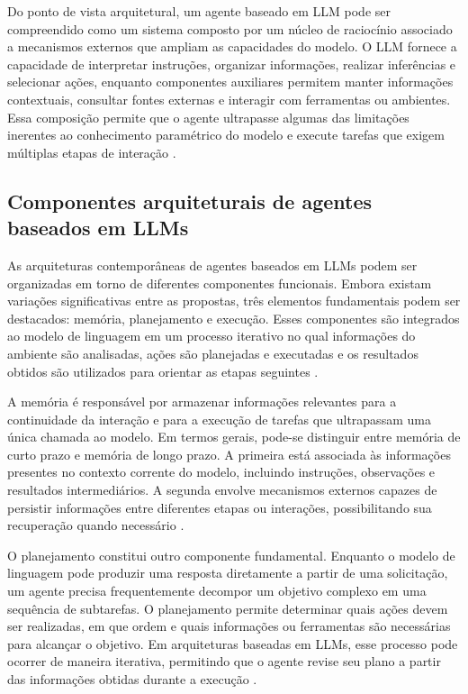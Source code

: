 Do ponto de vista arquitetural, um agente baseado em LLM pode ser compreendido como um sistema composto por um núcleo de raciocínio associado a mecanismos externos que ampliam as capacidades do modelo. O LLM fornece a capacidade de interpretar instruções, organizar informações, realizar inferências e selecionar ações, enquanto componentes auxiliares permitem manter informações contextuais, consultar fontes externas e interagir com ferramentas ou ambientes. Essa composição permite que o agente ultrapasse algumas das limitações inerentes ao conhecimento paramétrico do modelo e execute tarefas que exigem múltiplas etapas de interação \cite{cheng2026,zhao2026survey}.

\subsection{Componentes arquiteturais de agentes baseados em LLMs}

As arquiteturas contemporâneas de agentes baseados em LLMs podem ser organizadas em torno de diferentes componentes funcionais. Embora existam variações significativas entre as propostas, três elementos fundamentais podem ser destacados: memória, planejamento e execução. Esses componentes são integrados ao modelo de linguagem em um processo iterativo no qual informações do ambiente são analisadas, ações são planejadas e executadas e os resultados obtidos são utilizados para orientar as etapas seguintes \cite{cheng2026,zhao2026survey}.

A memória é responsável por armazenar informações relevantes para a continuidade da interação e para a execução de tarefas que ultrapassam uma única chamada ao modelo. Em termos gerais, pode-se distinguir entre memória de curto prazo e memória de longo prazo. A primeira está associada às informações presentes no contexto corrente do modelo, incluindo instruções, observações e resultados intermediários. A segunda envolve mecanismos externos capazes de persistir informações entre diferentes etapas ou interações, possibilitando sua recuperação quando necessário \cite{zhao2026survey}.

O planejamento constitui outro componente fundamental. Enquanto o modelo de linguagem pode produzir uma resposta diretamente a partir de uma solicitação, um agente precisa frequentemente decompor um objetivo complexo em uma sequência de subtarefas. O planejamento permite determinar quais ações devem ser realizadas, em que ordem e quais informações ou ferramentas são necessárias para alcançar o objetivo. Em arquiteturas baseadas em LLMs, esse processo pode ocorrer de maneira iterativa, permitindo que o agente revise seu plano a partir das informações obtidas durante a execução \cite{cheng2026,zhao2026survey}.

